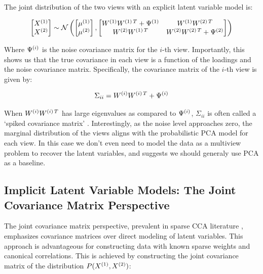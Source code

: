 The joint distribution of the two views with an explicit latent variable model is:

\begin{align}
    \begin{bmatrix}
        X^{(1)} \\ X^{(2)}
    \end{bmatrix} \sim \mathcal{N} \left( \begin{bmatrix}
                                              \mu^{(1)} \\ \mu^{(2)}
    \end{bmatrix}, \begin{bmatrix}
                       W^{(1)}W^{(1)\,T} + \Psi^{(1)} & W^{(1)}W^{(2)\,T} \\ W^{(2)}W^{(1)\,T} & W^{(2)}W^{(2)\,T} + \Psi^{(2)}
    \end{bmatrix} \right)
\end{align}

Where \(\Psi^{(i)}\) is the noise covariance matrix for the \(i\)-th view.
Importantly, this shows us that the true covariance in each view is a function of the loadings and the noise covariance matrix.
Specifically, the covariance matrix of the \(i\)-th view is given by:

\begin{align}
    \Sigma_{ii} = W^{(i)}W^{(i)\,T} + \Psi^{(i)}
\end{align}

When $W^{(i)}W^{(i)\,T}$ has large eigenvalues as compared to $\Psi^{(i)}$, $\Sigma_{ii}$ is often called a `spiked covariance matrix' \citep{johnstone2001distribution}.
Interestingly, as the noise level approaches zero, the marginal distribution of the views aligns with the probabilistic PCA model for each view.
In this case we don't even need to model the data as a multiview problem to recover the latent variables, and suggests we should generaly use PCA as a baseline.

\subsection{Implicit Latent Variable Models: The Joint Covariance Matrix Perspective}

The joint covariance matrix perspective, prevalent in sparse CCA literature \citep{suo2017sparse,chen2013sparse}, emphasizes covariance matrices over direct modeling of latent variables.
This approach is advantageous for constructing data with known sparse weights and canonical correlations.
This is achieved by constructing the joint covariance matrix of the distribution \(P(X^{(1)},X^{(2)})\):

